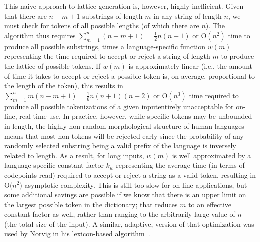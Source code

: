 This na\:ive approach to lattice generation is, however, highly inefficient. Given that there are $n-m+1$ substrings of length $m$ in any string of length $n$, we must check for tokens of all possible lengths (of which there are $n$). The algorithm thus requires $\sum_{m=1}^{n}(n-m+1)=\frac{1}{2}n(n+1)$ or O$(n^{2})$ time to produce all possible substrings, times a language-specific function $w(m)$ representing the time required to accept or reject a string of length $m$ to produce the lattice of possible tokens. If $w(m)$ is approximately linear (i.e., the amount of time it takes to accept or reject a possible token is, on average, proportional to the length of the token), this results in $\sum_{m=1}^{n}m(n-m+1)=\frac{1}{6}n(n+1)(n+2)$ or O$(n^{3})$ time required to produce all possible tokenizations of a given input\textemdash entirely unacceptable for on-line, real-time use.
In practice, however, while specific tokens may be unbounded in length, the highly non-random morphological structure of human languages means that most non-tokens will be rejected early since the probability of any randomly selected substring being a valid prefix of the language is inversely related to length. As a result, for long inputs, $w(m)$ is well approximated by a language-specific constant factor $k_w$ representing the average time (in terms of codepoints read) required to accept or reject a string as a valid token, resulting in O($n^{2}$) asymptotic complexity. This is still too slow for on-line applications, but some additional savings are possible if we know that there is an upper limit on the largest possible token in the dictionary; that reduces $m$ to an effective constant factor as well, rather than ranging to the arbitrarily large value of $n$ (the total size of the input). A similar, adaptive, version of that optimization was used by Norvig in his lexicon-based algorithm~\cite{norvig14}.

